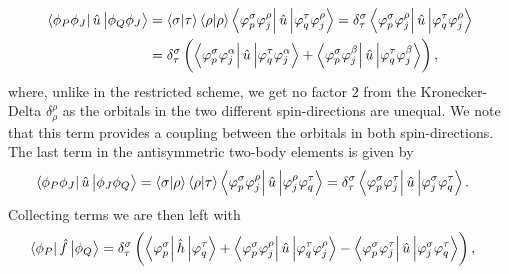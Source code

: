             \begin{align}
                \bra{\phi_P\phi_J}
                \hat{u}
                \ket{\phi_Q\phi_J}
                &=
                \braket{\sigma}{\tau}
                \braket{\rho}{\rho}
                \bra{\varphi^{\sigma}_{p}\varphi^{\rho}_{j}}
                \hat{u}
                \ket{\varphi^{\tau}_{q}\varphi^{\rho}_{j}}
                =
                \delta^{\sigma}_{\tau}
                \bra{\varphi^{\sigma}_{p}\varphi^{\rho}_{j}}
                \hat{u}
                \ket{\varphi^{\tau}_{q}\varphi^{\rho}_{j}}
                \\
                &=
                \delta^{\sigma}_{\tau}
                \left( 
                    \bra{\varphi^{\sigma}_{p}\varphi^{\alpha}_{j}}
                    \hat{u}
                    \ket{\varphi^{\tau}_{q}\varphi^{\alpha}_{j}}
                    +
                    \bra{\varphi^{\sigma}_{p}\varphi^{\beta}_{j}}
                    \hat{u}
                    \ket{\varphi^{\tau}_{q}\varphi^{\beta}_{j}}
                 \right),
            \end{align}
            where, unlike in the restricted scheme, we get no factor $2$ from
            the Kronecker-Delta $\delta^{\rho}_{\rho}$ as the orbitals in the two
            different spin-directions are unequal.
            We note that this term provides a coupling between the orbitals in
            both spin-directions.
            The last term in the antisymmetric two-body elements is given by
            \begin{align}
                \bra{\phi_P\phi_J}
                \hat{u}
                \ket{\phi_J\phi_Q}
                &=
                \braket{\sigma}{\rho}
                \braket{\rho}{\tau}
                \bra{\varphi^{\sigma}_{p}\varphi^{\rho}_{j}}
                \hat{u}
                \ket{\varphi^{\rho}_{j}\varphi^{\tau}_{q}}
                =
                \delta^{\sigma}_{\tau}
                \bra{\varphi^{\sigma}_{p}\varphi^{\tau}_{j}}
                \hat{u}
                \ket{\varphi^{\sigma}_{j}\varphi^{\tau}_{q}}.
            \end{align}
            Collecting terms we are then left with
            \begin{align}
                \bra{\phi_P}\hat{f}\ket{\phi_Q}
                &=
                \delta^{\sigma}_{\tau}
                \left( 
                    \bra{\varphi^{\sigma}_{p}}
                    \hat{h}
                    \ket{\varphi^{\tau}_{q}}
                    +
                    \bra{\varphi^{\sigma}_{p}\varphi^{\rho}_{j}}
                    \hat{u}
                    \ket{\varphi^{\tau}_{q}\varphi^{\rho}_{j}}
                    -
                    \bra{\varphi^{\sigma}_{p}\varphi^{\tau}_{j}}
                    \hat{u}
                    \ket{\varphi^{\sigma}_{j}\varphi^{\tau}_{q}}
                 \right),
            \end{align}
